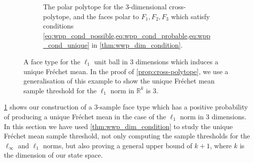 \documentclass[10pt]{article}
\theoremstyle{definition}
\theoremstyle{remark}
\newcommand{\R}{\mathbb{R}}
\begin{document}
\begin{figure}[ht!]
\begin{subfigure}[b]{0.48\textwidth}
			\caption{The polar polytope for the 3-dimensional cross-polytope, and the faces polar to $F_1, F_2, F_3$ which satisfy conditions \cref{eq:wpp_cond_possible,eq:wpp_cond_probable,eq:wpp_cond_unique} in \cref{thm:wwp_dim_condition}.}
		\end{subfigure}
		\caption{A face type for the $\ell_{1}$ unit ball in 3 dimensions which induces a unique Fr\'echet mean. In the proof of \cref{prop:cross-polytope}, we use a generalisation of this example to show the unique Fr\'echet mean sample threshold for the $\ell_{1}$ norm in $\R^k$ is $3$.}
		\label{fig:cross-polytope_face_types}
	\end{figure}
	
	\cref{fig:cross-polytope_face_types} shows our construction of a 3-sample face type which has a positive probability of producing a unique Fr\'echet mean in the case of the $\ell_1$ norm in 3 dimensions. \\
	
	In this section we have used \cref{thm:wwp_dim_condition} to study the unique Fr\'echet mean sample threshold, not only computing the sample thresholds for the $\ell_\infty$ and $\ell_1$ norms, but also proving a general upper bound of $k+1$, where $k$ is the dimension of our state space.
	
\end{document}
